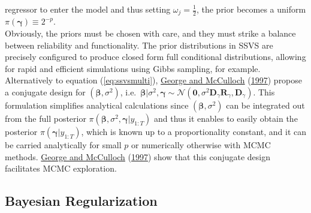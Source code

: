 \documentclass[
  12pt,
]{book}
\theoremstyle{break}
\theoremstyle{nonumberplain}
\begin{document}
regressor to enter the model and thus setting
\(\omega_{j}=\frac{1}{2}\), the prior becomes a uniform
\(\pi(\boldsymbol{\gamma})\equiv 2^{-p}\).\\
Obviously, the priors must be chosen with care, and they must strike a
balance between reliability and functionality. The prior distributions
in SSVS are precisely configured to produce closed form full conditional
distributions, allowing for rapid and efficient simulations using Gibbs
sampling, for example.\\
Alternatively to equation (\ref{eq:ssvsmulti}),
\protect\hyperlink{ref-GM_1997}{George and McCulloch}
(\protect\hyperlink{ref-GM_1997}{1997}) propose a conjugate design for
\((\boldsymbol{\beta},\sigma^{2})\),
i.e.~\(\boldsymbol{\beta}|\sigma^{2},\boldsymbol{\gamma}\sim\mathcal{N}(\boldsymbol{0},\sigma^{2}\boldsymbol{D}_{\gamma}\boldsymbol{R}_{\gamma},\boldsymbol{D}_{\gamma})\).
This formulation simplifies analytical calculations since
\((\boldsymbol{\beta},\sigma^{2})\) can be integrated out from the full
posterior
\(\pi(\boldsymbol{\beta},\sigma^{2},\boldsymbol{\gamma}|y_{1:T})\) and
thus it enables to easily obtain the posterior
\(\pi(\boldsymbol{\gamma}|y_{1:T})\), which is known up to a
proportionality constant, and it can be carried analytically for small
\(p\) or numerically otherwise with MCMC methods.
\protect\hyperlink{ref-GM_1997}{George and McCulloch}
(\protect\hyperlink{ref-GM_1997}{1997}) show that this conjugate design
facilitates MCMC exploration.

\subsection{Bayesian Regularization}
\end{document}
